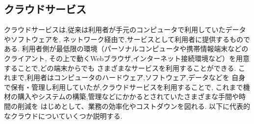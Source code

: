 \subsection{クラウドサービス}
クラウドサービスは,従来は利用者が手元のコンピュータで利用していたデータやソフトウェアを,
ネットワーク経由で,サービスとして利用者に提供するものである.
利用者側が最低限の環境（パーソナルコンピュータや携帯情報端末などのクライアント,
その上で動くWebブラウザ,インターネット接続環境など）を用意することで,どの端末からでも
さまざまなサービスを利用することができる.
これまで,利用者はコンピュータのハードウェア,ソフトウェア,データなどを
自身で保有・管理し利用していたが,クラウドサービスを利用することで,
これまで機材の購入やシステムの構築,管理などにかかるとされていたさまざまな手間や時間の削減を
はじめとして、業務の効率化やコストダウンを図れる.
以下に代表的なクラウドについていくつか説明する.

\renewcommand{\labelenumi}{(\arabic{enumi})}

